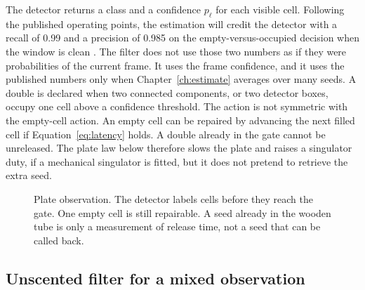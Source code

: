 The detector returns a class and a confidence \(p_{\ell}\) for each visible cell. Following the published operating points, the estimation will credit the detector with a recall of \num{0.99} and a precision of \num{0.985} on the empty-versus-occupied decision when the window is clean \cite{blaser2024,zhao2025yolo}. The filter does not use those two numbers as if they were probabilities of the current frame. It uses the frame confidence, and it uses the published numbers only when Chapter~\ref{ch:estimate} averages over many seeds. A double is declared when two connected components, or two detector boxes, occupy one cell above a confidence threshold. The action is not symmetric with the empty-cell action. An empty cell can be repaired by advancing the next filled cell if Equation~\eqref{eq:latency} holds. A double already in the gate cannot be unreleased. The plate law below therefore slows the plate and raises a singulator duty, if a mechanical singulator is fitted, but it does not pretend to retrieve the extra seed.

\begin{figure}[ht]
\centering
{}
\caption{Plate observation. The detector labels cells before they reach the gate. One empty cell is still repairable. A seed already in the wooden tube is only a measurement of release time, not a seed that can be called back.}
\label{fig:plate}
\end{figure}

\subsection{Unscented filter for a mixed observation}

